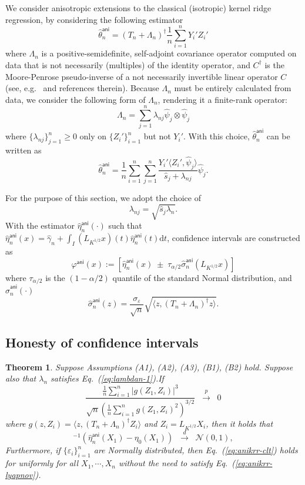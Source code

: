 \documentclass[11pt,a4paper]{article}
\renewcommand{\hat}{\widehat}
\theoremstyle{definition}
\theoremstyle{plain}
\newtheorem{theorem}{Theorem}[section]
\theoremstyle{remark}
\newcommand{\ud}{\mathrm d}
\newcommand{\ani}{\mathsf{ani}}
\begin{document}
We consider anisotropic extensions to the classical (isotropic) kernel ridge regression, by considering the following estimator
$$
\hat\theta_n^\ani = (T_n+\Lambda_n)^{\dagger}\frac{1}{n}\sum_{i=1}^n Y_i' Z_i'
$$
where $\Lambda_n$ is a positive-semidefinite, self-adjoint covariance operator computed on data that is not necessarily (multiples) of the identity operator,
and $C^\dagger$ is the Moore-Penrose pseudo-inverse of a not necessarily invertible linear operator $C$ (see, e.g.~\citep{fongi2023moore} and references therein).
Because $\Lambda_n$ must be entirely calculated from data, we consider the following form of $\Lambda_n$, rendering it a finite-rank operator:
$$
\Lambda_n = \sum_{j=1}^n \lambda_{nj}\hat\psi_j\otimes\hat\psi_j
$$
where $\{\lambda_{nj}\}_{j=1}^n\geq 0$ only on $\{Z_i'\}_{i=1}^n$ but not $Y_i'$.
With this choice, $\hat\theta_n^\ani$ can be written as
$$
\hat\theta_n^\ani = \frac{1}{n}\sum_{i=1}^n\sum_{j=1}^n \frac{Y_i'\langle Z_i',\hat\psi_j\rangle}{\hat s_j+\lambda_{nj}}\hat\psi_j.
$$

For the purpose of this section, we adopt the choice of 
$$
\lambda_{nj} = \sqrt{\hat s_j\lambda_n}.
$$
With the estimator $\hat\eta^\ani_n(\cdot)$ such that $\hat\eta^\ani_n(x)=\hat\gamma_n+\int_I (L_{K^{1/2}}x)(t)\hat\eta^\ani_n(t)\ud t$, confidence intervals are constructed as
$$
\varphi^\ani(x) := [\hat\eta^\ani_n(x)\;\pm\;\tau_{\alpha/2}\hat\sigma_n^\ani(L_{K^{1/2}}x)]
$$
where $\tau_{\alpha/2}$ is the $(1-\alpha/2)$ quantile of the standard Normal distribution, and $\hat\sigma_n^\ani(\cdot)$ 
$$
\hat\sigma_n^\ani(z) = \frac{\sigma_\varepsilon}{\sqrt{n}}\sqrt{\langle z, (T_n+\Lambda_n)^{\dagger}z\rangle}.
$$

\subsection{Honesty of confidence intervals}

\begin{theorem}
Suppose Assumptions (A1), (A2), (A3), (B1), (B2) hold. Suppose also that $\lambda_n$ satisfies Eq.~(\ref{eq:lambdan-1}).If 
\begin{equation}
\frac{\frac{1}{n}\sum_{i=1}^n |g(Z_1,Z_i)|^3}{\sqrt{n}(\frac{1}{n}\sum_{i=1}^n g(Z_1,Z_i)^2)^{3/2}}\;\;\overset{p}{\to}\;\; 0
\label{eq:anikrr-lyapnov}
\end{equation}
where $g(z,Z_i)=\langle z,(T_n+\Lambda_n)^{\dagger}Z_i\rangle$ and $Z_i=L_{K^{1/2}}X_i$, then it holds that
\begin{equation}
[\hat\sigma_n^\ani(Z_1)]^{-1}(\hat\eta_n^\ani(X_1)-\eta_0(X_1)) \;\;\overset{d}{\to}\;\;\mathcal N(0,1),
\label{eq:anikrr-clt}
\end{equation}
Furthermore, if $\{\varepsilon_i\}_{i=1}^n$ are Normally distributed, then Eq.~(\ref{eq:anikrr-clt}) holds for \emph{uniformly} for all $X_1,\cdots,X_n$ without the need to satisfy Eq.~(\ref{eq:anikrr-lyapnov}).
\label{thm:anikrr-limiting}
\end{theorem}
\end{document}
